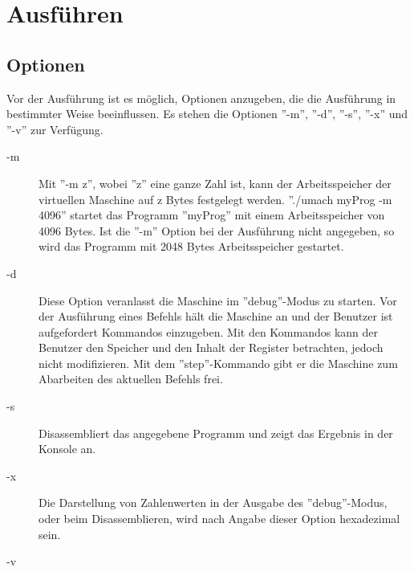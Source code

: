 \section{Ausführen}

\subsection{Optionen}
Vor der Ausführung ist es möglich, Optionen anzugeben, die die Ausführung in bestimmter Weise beeinflussen. Es stehen die Optionen ''-m'', ''-d'', ''-s'', ''-x'' und ''-v'' zur Verfügung.
\begin{description}
\item[-m]
Mit ''-m z'', wobei ''z'' eine ganze Zahl ist, kann der Arbeitsspeicher der virtuellen Maschine auf z Bytes festgelegt werden. ''./umach myProg -m 4096'' startet das Programm ''myProg'' mit einem Arbeitsspeicher von 4096 Bytes. Ist die ''-m'' Option bei der Ausführung nicht angegeben, so wird das Programm mit 2048 Bytes Arbeitsspeicher gestartet.
\item[-d]
Diese Option veranlasst die Maschine im ''debug''-Modus zu starten. Vor der Ausführung eines Befehls hält die Maschine an und der Benutzer ist aufgefordert Kommandos einzugeben. Mit den Kommandos kann der Benutzer den Speicher und den Inhalt der Register betrachten, jedoch nicht modifizieren. Mit dem ''step''-Kommando gibt er die Maschine zum Abarbeiten des aktuellen Befehls frei.
\item[-s]
Disassembliert das angegebene Programm und zeigt das Ergebnis in der Konsole an.
\item[-x]
Die Darstellung von Zahlenwerten in der Ausgabe des ''debug''-Modus, oder beim Disassemblieren, wird nach Angabe dieser Option hexadezimal sein.
\item[-v]



\end{description}

